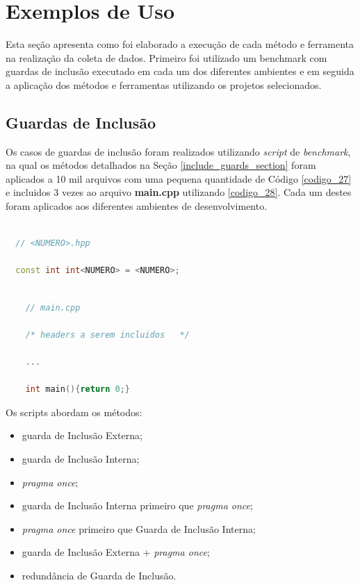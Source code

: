 \section {Exemplos de Uso}

	Esta seção apresenta como foi elaborado a execução
 de cada método e ferramenta na realização da coleta de dados.
Primeiro foi utilizado um benchmark com guardas de inclusão
 executado em cada um dos diferentes ambientes e
 em seguida a aplicação dos métodos e ferramentas utilizando
 os projetos selecionados.

\subsection{Guardas de Inclusão}

Os casos de guardas de inclusão foram realizados utilizando \textit{script} de \textit{benchmark},
 na qual os métodos detalhados na Seção \ref{include_guards_section} foram
 aplicados a 10 mil arquivos com uma pequena quantidade de Código
 \ref{codigo_27} e incluidos 3 vezes ao arquivo \textbf{main.cpp} utilizando
 \ref{codigo_28}. Cada um destes foram aplicados aos diferentes ambientes de
 desenvolvimento.

\begin{lstlisting}[language=C++,caption={Template de arquivo .hpp utilizado no \textit{benchmark}},
                                                   label=codigo_27]

  // <NUMERO>.hpp

  const int int<NUMERO> = <NUMERO>;

\end{lstlisting}

\begin{lstlisting}[language=C++,caption={Template de arquivo main.cpp utilizado no \textit{benchmark}},
                                                          label=codigo_28]

    // main.cpp

    /* headers a serem incluidos   */

    ...

    int main(){return 0;}
\end{lstlisting}

Os scripts abordam os métodos:

\begin{itemize}
	\item guarda de Inclusão Externa;
	\item guarda de Inclusão Interna;
	\item \textit{pragma once};
	\item guarda de Inclusão Interna primeiro que \textit{pragma once};
	\item \textit{pragma once} primeiro que  Guarda de Inclusão Interna;
	\item guarda de Inclusão Externa + \textit{pragma once};
	\item redundância de Guarda de Inclusão.
\end{itemize}

